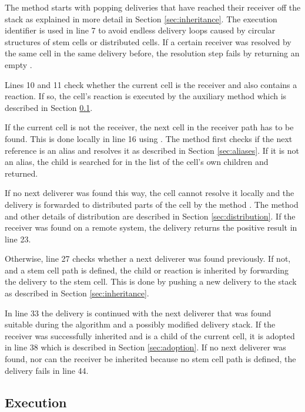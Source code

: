 The method starts with popping deliveries that have reached their receiver off the stack as explained in more detail in Section \ref{sec:inheritance}. The execution identifier is used in line 7 to avoid endless delivery loops caused by circular structures of stem cells or distributed cells. If a certain receiver was resolved by the same cell in the same delivery before, the resolution step fails by returning an empty .

Lines 10 and 11 check whether the current cell is the receiver and also contains a reaction. If so, the cell's reaction is executed by the auxiliary method  which is described in Section \ref{sec:binding_execution}.

If the current cell is not the receiver, the next cell in the receiver path has to be found. This is done locally in line 16 using . The method first checks if the next reference is an alias and resolves it as described in Section \ref{sec:aliases}. If it is not an alias, the child is searched for in the list of the cell's own children and returned.

If no next deliverer was found this way, the cell cannot resolve it locally and the delivery is forwarded to distributed parts of the cell by the method . The method and other details of distribution are described in Section \ref{sec:distribution}. If the receiver was found on a remote system, the delivery returns the positive result in line 23.

Otherwise, line 27 checks whether a next deliverer was found previously. If not, and a stem cell path is defined, the child or reaction is inherited by forwarding the delivery to the stem cell. This is done by pushing a new delivery to the stack as described in Section \ref{sec:inheritance}.

In line 33 the delivery is continued with the next deliverer that was found suitable during the algorithm and a possibly modified delivery stack. If the receiver was successfully inherited and is a child of the current cell, it is adopted in line 38 which is described in Section \ref{sec:adoption}. If no next deliverer was found, nor can the receiver be inherited because no stem cell path is defined, the delivery fails in line 44.

\subsection{Execution}
\label{sec:binding_execution}

